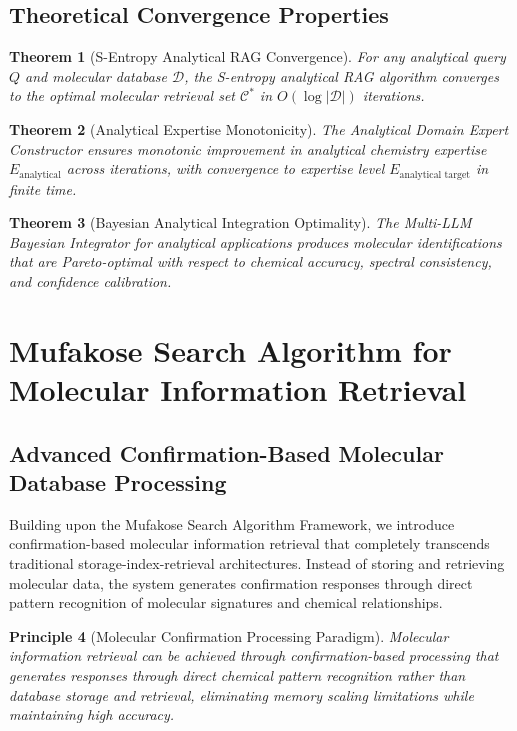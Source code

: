 \documentclass[11pt,a4paper]{article}
\newtheorem{theorem}{Theorem}[section]
\newtheorem{principle}[theorem]{Principle}
\theoremstyle{remark}
\begin{document}
\subsection{Theoretical Convergence Properties}

\begin{theorem}[S-Entropy Analytical RAG Convergence]
For any analytical query $Q$ and molecular database $\mathcal{D}$, the S-entropy analytical RAG algorithm converges to the optimal molecular retrieval set $\mathcal{C}^*$ in $O(\log |\mathcal{D}|)$ iterations.
\end{theorem}

\begin{theorem}[Analytical Expertise Monotonicity]
The Analytical Domain Expert Constructor ensures monotonic improvement in analytical chemistry expertise $E_{\text{analytical}}$ across iterations, with convergence to expertise level $E_{\text{analytical target}}$ in finite time.
\end{theorem}

\begin{theorem}[Bayesian Analytical Integration Optimality]
The Multi-LLM Bayesian Integrator for analytical applications produces molecular identifications that are Pareto-optimal with respect to chemical accuracy, spectral consistency, and confidence calibration.
\end{theorem}

\section{Mufakose Search Algorithm for Molecular Information Retrieval}

\subsection{Advanced Confirmation-Based Molecular Database Processing}

Building upon the Mufakose Search Algorithm Framework, we introduce confirmation-based molecular information retrieval that completely transcends traditional storage-index-retrieval architectures. Instead of storing and retrieving molecular data, the system generates confirmation responses through direct pattern recognition of molecular signatures and chemical relationships.

\begin{principle}[Molecular Confirmation Processing Paradigm]
Molecular information retrieval can be achieved through confirmation-based processing that generates responses through direct chemical pattern recognition rather than database storage and retrieval, eliminating memory scaling limitations while maintaining high accuracy.
\end{principle}
\end{document}
